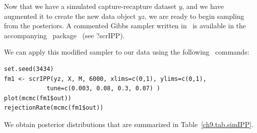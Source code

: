 Now that we have a simulated capture-recapture dataset $y$, and we have
augmented it to create the new data object $yz$, we are ready to
begin sampling from the posteriors. A commented Gibbs sampler written
in \R~is available in the accompanying \R~package \scrbook~(see
?scrIPP).

We can apply this modified sampler to our data using the
following \R~commands:
\begin{small}
\begin{verbatim}
set.seed(3434)
fm1 <- scrIPP(yz, X, M, 6000, xlims=c(0,1), ylims=c(0,1),
            tune=c(0.003, 0.08, 0.3, 0.07) )
plot(mcmc(fm1$out))
rejectionRate(mcmc(fm1$out))
\end{verbatim}
\end{small}
We obtain posterior distributions that are summarized in
Table~\ref{ch9.tab.simIPP}.


